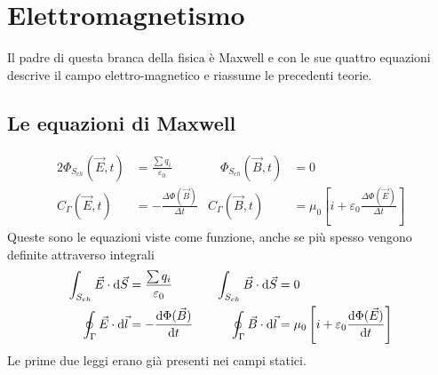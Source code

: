 
\section{Elettromagnetismo}
Il padre di questa branca della fisica è Maxwell e con le sue quattro equazioni descrive il campo
elettro-magnetico e riassume le precedenti teorie.
\subsection{Le equazioni di Maxwell}
\begin{alignat*}{2}
  \Phi_{S_{ch}}(\vec{E},t) &= \frac{\sum q_i}{\varepsilon_0} &\quad \Phi_{S_{ch}}(\vec{B},t)&=0\\
  C_\Gamma(\vec{E},t) &= -\frac{\Delta \Phi(\vec{B})}{\Delta t} & C_\Gamma(\vec{B},t) &=
  \mu_0 \left[ i+\varepsilon_0 \frac{\Delta\Phi(\vec{E})}{\Delta t} \right]
\end{alignat*}
Queste sono le equazioni viste come funzione, anche se più spesso vengono definite attraverso
integrali
\begin{alignat*}{2}
  \int_{S_{ch}}\vec{E}\cdot\dif\vec{S} &= \frac{\sum q_i}{\varepsilon_0} &\quad 
  \int_{S_{ch}}\vec{B}\cdot\dif\vec{S}&=0\\
  \oint_\Gamma\vec{E}\cdot\dif\vec{l}&=-\der{\Phi(\vec{B})}{t} & 
  \oint_\Gamma\vec{B}\cdot\dif\vec{l}&=
  \mu_0 \left[ i+\varepsilon_0 \der{\Phi(\vec{E})}{t} \right]
\end{alignat*}
Le prime due leggi erano già presenti nei campi statici.

